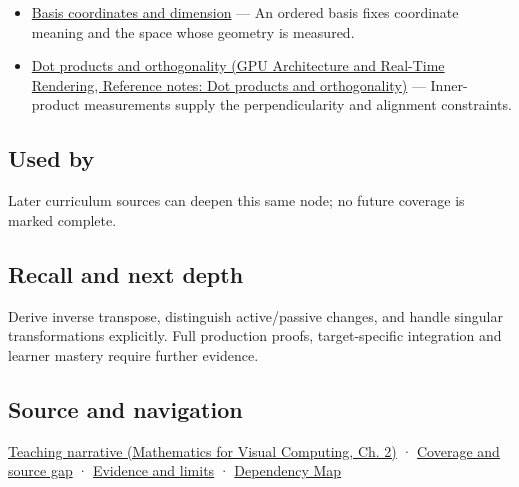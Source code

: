 \begin{itemize}
\tightlist
\item
  \hyperref[appendix-ce0341f7ea0d]{Basis coordinates and dimension} --- An ordered basis fixes coordinate meaning and the space whose geometry is measured.
\item
  \href{../06-GPU-Architecture-and-Real-Time-Rendering/main.pdf\#nameddest=appendix-8bc4e8fc547c}{Dot products and orthogonality (GPU Architecture and Real-Time Rendering, Reference notes: Dot products and orthogonality)} --- Inner-product measurements supply the perpendicularity and alignment constraints.
\end{itemize}

\subsection{Used by}\label{appendix-46da295c6787-used-by}

\hypertarget{appendix-46da295c6787-used-by}{}

Later curriculum sources can deepen this same node; no future coverage is marked complete.

\subsection{Recall and next depth}\label{appendix-46da295c6787-recall-and-next-depth}

\hypertarget{appendix-46da295c6787-recall-and-next-depth}{}

Derive inverse transpose, distinguish active/passive changes, and handle singular transformations explicitly. Full production proofs, target-specific integration and learner mastery require further evidence.

\subsection{Source and navigation}\label{appendix-46da295c6787-source-and-navigation}

\hypertarget{appendix-46da295c6787-source-and-navigation}{}

\href{../02-Mathematics-for-Visual-Computing/main.pdf\#nameddest=01-foundations-i-ch018-a-normal-is-a-measuring-rule-before-it-is-an-arrow}{Teaching narrative (Mathematics for Visual Computing, Ch. 2)} · \hyperref[appendix-fd090d982a15-phase-6---parts-501-600]{Coverage and source gap} · \hyperref[appendix-a103e7846d21-phase-6---source-analysis-and-verification]{Evidence and limits} · \hyperref[appendix-4ad47bdd269a]{Dependency Map}
